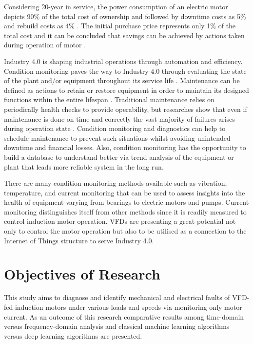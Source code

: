 Considering 20-year in service, the power consumption of an electric motor depicts 90\% of the total cost of ownership and followed by downtime costs as 5\% and rebuild costs as 4\% \cite{waide2011energy}. The initial purchase price represents only 1\% of the total cost and it can be concluded that savings can be achieved by actions taken during operation of motor \cite{waide2011energy}.

Industry 4.0 is shaping industrial operations through automation and efficiency. Condition monitoring paves the way to Industry 4.0 through evaluating the state of the plant and/or equipment throughout its service life \cite{en201713306}. Maintenance can be defined as actions to retain or restore equipment in order to maintain its designed functions within the entire lifespan \cite{en201713306}. Traditional maintenance relies on periodically health checks to provide operability, but researches show that even if maintenance is done on time and correctly the vast majority of failures arises during operation state \cite{motor1985report}. Condition monitoring and diagnostics can help to schedule maintenance to prevent such situations whilst avoiding unintended downtime and financial losses. Also, condition monitoring has the opportunity to build a database to understand better via trend analysis of the equipment or plant that leads more reliable system in the long run. 

There are many condition monitoring methods available such as vibration, temperature, and current monitoring that can be used to assess insights into the health of equipment varying from bearings to electric motors and pumps. Current monitoring distinguishes itself from other methods since it is readily measured to control induction motor operation. VFDs are presenting a great potential not only to control the motor operation but also to be utilised as a connection to the Internet of Things structure to serve Industry 4.0.
\pagebreak
\section{Objectives of Research}
\label{objectives}

This study aims to diagnose and identify mechanical and electrical faults of VFD-fed induction motors under various loads and speeds via monitoring only motor current. As an outcome of this research comparative results among time-domain versus frequency-domain analysis and classical machine learning algorithms versus deep learning algorithms are presented.

